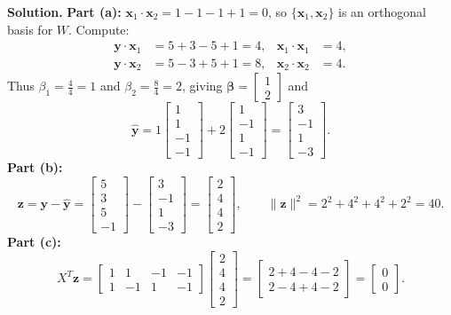 \documentclass[11pt, letterpaper]{article}
\theoremstyle{definition}
\theoremstyle{remark}
\begin{document}
\textbf{Solution.}
\textbf{Part (a):} $\mathbf{x}_1 \cdot \mathbf{x}_2 = 1 - 1 - 1 + 1 = 0$, so $\{\mathbf{x}_1, \mathbf{x}_2\}$ is an orthogonal basis for $W$. Compute:
\begin{align*}
\mathbf{y} \cdot \mathbf{x}_1 &= 5 + 3 - 5 + 1 = 4, & \mathbf{x}_1 \cdot \mathbf{x}_1 &= 4, \\
\mathbf{y} \cdot \mathbf{x}_2 &= 5 - 3 + 5 + 1 = 8, & \mathbf{x}_2 \cdot \mathbf{x}_2 &= 4.
\end{align*}
Thus $\beta_1 = \frac{4}{4} = 1$ and $\beta_2 = \frac{8}{4} = 2$, giving $\boldsymbol{\beta} = \begin{bmatrix} 1 \\ 2 \end{bmatrix}$ and
\[
\hat{\mathbf{y}} = 1\begin{bmatrix} 1 \\ 1 \\ -1 \\ -1 \end{bmatrix} + 2\begin{bmatrix} 1 \\ -1 \\ 1 \\ -1 \end{bmatrix} = \begin{bmatrix} 3 \\ -1 \\ 1 \\ -3 \end{bmatrix}.
\]
\textbf{Part (b):}
\[
\mathbf{z} = \mathbf{y} - \hat{\mathbf{y}} = \begin{bmatrix} 5 \\ 3 \\ 5 \\ -1 \end{bmatrix} - \begin{bmatrix} 3 \\ -1 \\ 1 \\ -3 \end{bmatrix} = \begin{bmatrix} 2 \\ 4 \\ 4 \\ 2 \end{bmatrix}, \qquad \|\mathbf{z}\|^2 = 2^2 + 4^2 + 4^2 + 2^2 = 40.
\]
\textbf{Part (c):}
\[
X^T \mathbf{z} = \begin{bmatrix} 1 & 1 & -1 & -1 \\ 1 & -1 & 1 & -1 \end{bmatrix}\begin{bmatrix} 2 \\ 4 \\ 4 \\ 2 \end{bmatrix} = \begin{bmatrix} 2 + 4 - 4 - 2 \\ 2 - 4 + 4 - 2 \end{bmatrix} = \begin{bmatrix} 0 \\ 0 \end{bmatrix}.
\]
\end{document}
